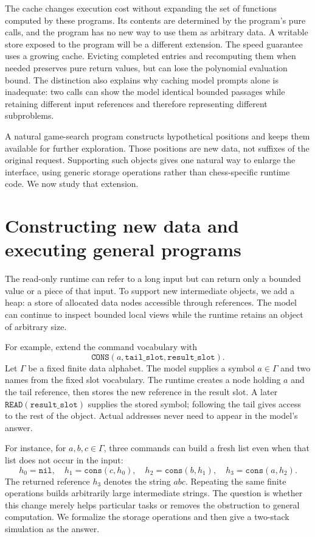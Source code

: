 \documentclass[11pt,twoside]{article}
\theoremstyle{definition}
\theoremstyle{remark}
\begin{document}
The cache changes execution cost without expanding the set of functions
computed by these programs. Its contents are determined by the program's
pure calls, and the program has no new way to use them as arbitrary data.
A writable store exposed to the program will be a different extension.
The speed guarantee uses a growing cache. Evicting completed entries and
recomputing them when needed preserves pure return values, but can lose the
polynomial evaluation bound.
The distinction also explains why caching model prompts alone is inadequate:
two calls can show the model identical bounded passages while retaining
different input references and therefore representing different subproblems.

A natural game-search program constructs hypothetical positions and keeps
them available for further exploration. Those positions are new data, not
suffixes of the original request. Supporting such objects gives one natural
way to enlarge the interface, using generic storage operations rather than
chess-specific runtime code. We now study that extension.

\section{Constructing new data and executing general programs}
\label{sec:constructible}

The read-only runtime can refer to a long input but can return only a
bounded value or a piece of that input. To support new intermediate objects,
we add a heap: a store of allocated data nodes accessible through references.
The model can continue to inspect bounded local views while the runtime
retains an object of arbitrary size.

For example, extend the command vocabulary with
\begin{equation}
 \mathtt{CONS}(a,\mathtt{tail\_slot},\mathtt{result\_slot}).
 \label{eq:cons-command}
\end{equation}
Let $\Gamma$ be a fixed finite data alphabet. The model supplies a symbol
$a\in\Gamma$ and two names from the fixed slot vocabulary.
The runtime creates a node holding $a$ and the tail reference, then stores
the new reference in the result slot. A later
$\mathtt{READ}(\mathtt{result\_slot})$ supplies the stored symbol; following
the tail gives access to the rest of the object. Actual addresses never
need to appear in the model's answer.

For instance, for $a,b,c\in\Gamma$, three commands can build a fresh list
even when that list does not occur in the input:
\[
 h_0=\mathtt{nil},\quad h_1=\mathtt{cons}(c,h_0),\quad
 h_2=\mathtt{cons}(b,h_1),\quad h_3=\mathtt{cons}(a,h_2).
\]
The returned reference $h_3$ denotes the string $abc$. Repeating the same
finite operations builds arbitrarily large intermediate strings. The
question is whether this change merely helps particular tasks or removes
the obstruction to general computation. We formalize the storage operations
and then give a two-stack simulation as the answer.
\end{document}

